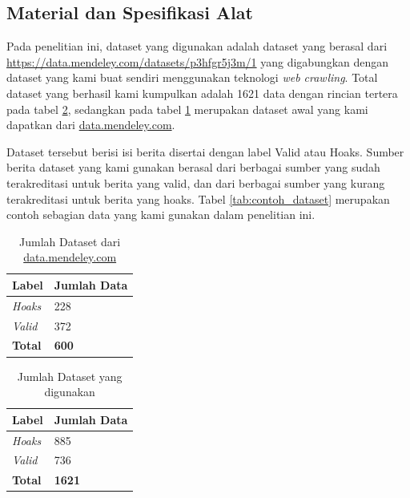 \subsection{Material dan Spesifikasi Alat}

Pada penelitian ini, dataset yang digunakan adalah dataset yang berasal dari \url{https://data.mendeley.com/datasets/p3hfgr5j3m/1} yang digabungkan dengan dataset yang kami buat sendiri menggunakan teknologi \textit{web crawling}. Total dataset yang berhasil kami kumpulkan adalah 1621 data dengan rincian tertera pada tabel \ref{tab:dataset}, sedangkan pada tabel \ref{tab:dataset_mendeley} merupakan dataset awal yang kami dapatkan dari \url{data.mendeley.com}.

Dataset tersebut berisi isi berita disertai dengan label Valid atau Hoaks. Sumber berita dataset yang kami gunakan berasal dari berbagai sumber yang sudah terakreditasi untuk berita yang valid, dan dari berbagai sumber yang kurang terakreditasi untuk berita yang hoaks. Tabel \ref{tab:contoh_dataset} merupakan contoh sebagian data yang kami gunakan dalam penelitian ini.

\begin{table}
    \caption{Jumlah Dataset dari \url{data.mendeley.com}}
    \label{tab:dataset_mendeley}
    \centering
    \begin{tabular}{ | l | l | }
        \hline
        \textbf{Label} & \textbf{Jumlah Data} \\ \hline
        \textit{Hoaks} & 228                  \\ \hline
        \textit{Valid} & 372                  \\ \hline
        \textbf{Total} & \textbf{600}         \\ \hline
    \end{tabular}
\end{table}

\begin{table}
    \caption{Jumlah Dataset yang digunakan}
    \label{tab:dataset}
    \centering
    \begin{tabular}{ | l | l | }
        \hline
        \textbf{Label} & \textbf{Jumlah Data} \\ \hline
        \textit{Hoaks} & 885                  \\ \hline
        \textit{Valid} & 736                  \\ \hline
        \textbf{Total} & \textbf{1621}        \\ \hline
    \end{tabular}
\end{table}


